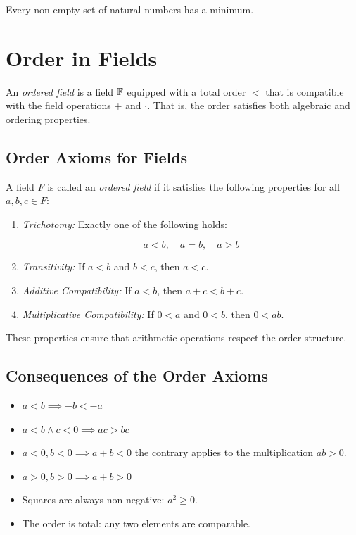 Every non-empty set of natural numbers has a minimum.

\section{Order in Fields}

An \emph{ordered field} is a field \(\mathbb{F}\) equipped with a total order \( < \) that is compatible with
the field operations + and \( \cdot \). That is, the order satisfies both algebraic and ordering
properties.

\subsection{Order Axioms for Fields}

A field \(F\) is called an \emph{ordered field} if it satisfies the following properties for all
\( a, b, c \in F \):

\begin{enumerate}[label=\Roman*.]

	\item \emph{Trichotomy:} Exactly one of the following holds:

	      \[
		      a < b, \quad a = b, \quad a > b
	      \]

	\item \emph{Transitivity:} If \( a < b \) and \( b < c \), then \( a < c \).

	\item \emph{Additive Compatibility:} If \( a < b \), then \( a + c < b + c \).

	\item \emph{Multiplicative Compatibility:} If \( 0 < a \) and \( 0 < b \), then \( 0 < ab \).

\end{enumerate}

These properties ensure that arithmetic operations respect the order structure.

\subsection{Consequences of the Order Axioms}

\begin{itemize}

	\item \( a < b \implies -b < -a \)

	\item \( a < b \land c < 0 \implies ac > bc \)

	\item \(a < 0, b < 0 \implies a + b < 0\) the contrary applies to the multiplication \(ab > 0\).

	\item \(a > 0, b > 0 \implies a + b > 0\)

	\item Squares are always non-negative: \( a^2 \ge 0 \).

	\item The order is total: any two elements are comparable.

\end{itemize}

